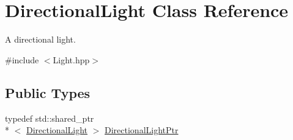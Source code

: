 \hypertarget{classDirectionalLight}{\section{Directional\+Light Class Reference}
\label{classDirectionalLight}
}


A directional light.  




{\ttfamily \#include $<$Light.\+hpp$>$}

\subsection*{Public Types}
\begin{DoxyCompactItemize}
\item 
typedef std\+::shared\+\_\+ptr\\*
$<$ \hyperlink{classDirectionalLight}{Directional\+Light} $>$ \hyperlink{classDirectionalLight_abb43c478c01d5e7c158699e9f3661bce}{Directional\+Light\+Ptr}
\end{DoxyCompactItemize}
